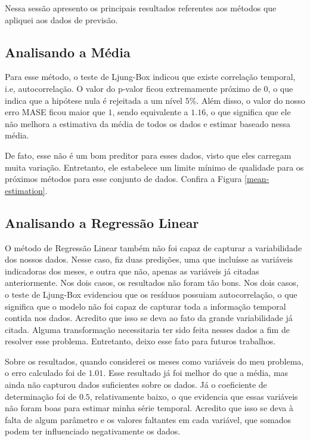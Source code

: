 Nessa sessão apresento os principais resultados referentes aos métodos que
apliquei aos dados de previsão. 

\subsection{Analisando a Média}

Para esse método, o teste de Ljung-Box indicou que existe correlação temporal,
i.e, autocorrelação. O valor do p-valor ficou extremamente próximo de $0$, o
que indica que a hipótese nula é rejeitada a um nível $5\%$. Além disso, o
valor do nosso erro MASE ficou maior que $1$, sendo equivalente a $1.16$, o
que significa que ele não melhora a estimativa da média de todos os dados e
estimar baseado nessa média.

De fato, esse não é um bom preditor para esses dados, visto que eles carregam
muita variação. Entretanto, ele estabelece um limite mínimo de qualidade para
os próximos métodos para esse conjunto de dados. Confira a Figura
\ref{mean-estimation}.

\subsection{Analisando a Regressão Linear}

O método de Regressão Linear também não foi capaz de capturar a variabilidade
dos nossos dados. Nesse caso, fiz duas predições, uma que incluísse as
variáveis indicadoras dos meses, e outra que não, apenas as variáveis já
citadas anteriormente. Nos dois casos, os resultados não foram tão bons. 
Nos dois casos, o teste de Ljung-Box evidenciou que os resíduos possuiam
autocorrelação, o que significa que o modelo não foi capaz de capturar toda a
informação temporal contida nos dados. Acredito que isso se deva ao fato da
grande variabilidade já citada. Alguma transformação necessitaria ter sido
feita nesses dados a fim de resolver esse problema. Entretanto, deixo esse
fato para futuros trabalhos.

Sobre os resultados, quando considerei os meses como variáveis do meu
problema, o erro calculado foi de $1.01$. Esse resultado já foi melhor do que
a média, mas ainda não capturou dados suficientes sobre os dados. Já o
coeficiente de determinação foi de $0.5$, relativamente baixo, o que evidencia
que essas variáveis não foram boas para estimar minha série temporal. Acredito
que isso se deva à falta de algum parâmetro e os valores faltantes em cada
variável, que somados podem ter influenciado negativamente os dados. 

